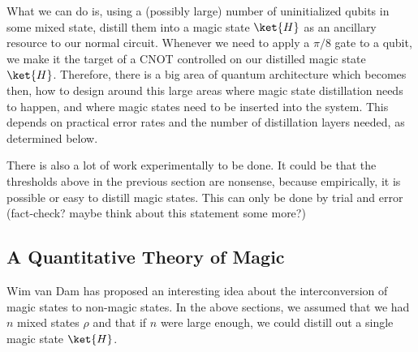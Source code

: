 What we can do is, using a (possibly large) number of uninitialized qubits
in some mixed state, distill them into a magic state $\ket{H}$ as an ancillary
resource to our normal circuit. Whenever we need to apply a $\pi/8$ gate to
a qubit, we make it the target of a CNOT controlled on our distilled magic
state $\ket{H}$. Therefore, there is a big area of quantum architecture which
becomes then, how to design around this large areas where magic state
distillation needs to happen, and where magic states need to be inserted
into the system. This depends on practical error rates and the number of
distillation layers needed, as determined below.

There is also a lot of work experimentally to be done. It could be that the
thresholds above in the previous section are nonsense, because empirically,
it is possible or easy to distill magic states. This can only be done
by trial and error (fact-check? maybe think about this statement some more?)

\subsection{A Quantitative Theory of Magic}

Wim van Dam has proposed an interesting idea about the interconversion of
magic states to non-magic states. In the above sections, we assumed that we
had $n$ mixed states $\rho$ and that if $n$ were large enough, we could
distill out a single magic state $\ket{H}$.